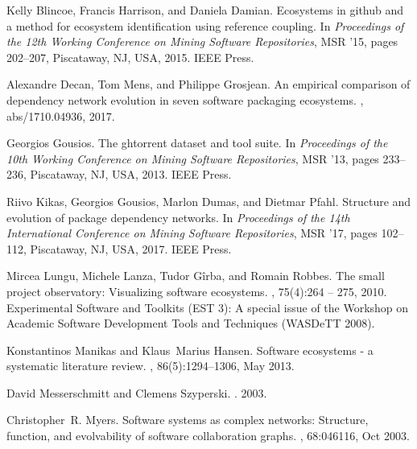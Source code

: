 \documentclass[10pt,conference]{IEEEtran}
\begin{document}
\begin{thebibliography}{00}

  Kelly Blincoe, Francis Harrison, and Daniela Damian.
  \newblock Ecosystems in github and a method for ecosystem identification using
    reference coupling.
  \newblock In {\em Proceedings of the 12th Working Conference on Mining Software
    Repositories}, MSR '15, pages 202--207, Piscataway, NJ, USA, 2015. IEEE
    Press.
  
  Alexandre Decan, Tom Mens, and Philippe Grosjean.
  \newblock An empirical comparison of dependency network evolution in seven
    software packaging ecosystems.
  , abs/1710.04936, 2017.
  
  Georgios Gousios.
  \newblock The ghtorrent dataset and tool suite.
  \newblock In {\em Proceedings of the 10th Working Conference on Mining Software
    Repositories}, MSR '13, pages 233--236, Piscataway, NJ, USA, 2013. IEEE
    Press.
  
  Riivo Kikas, Georgios Gousios, Marlon Dumas, and Dietmar Pfahl.
  \newblock Structure and evolution of package dependency networks.
  \newblock In {\em Proceedings of the 14th International Conference on Mining
    Software Repositories}, MSR '17, pages 102--112, Piscataway, NJ, USA, 2017.
    IEEE Press.
  
  Mircea Lungu, Michele Lanza, Tudor Gîrba, and Romain Robbes.
  \newblock The small project observatory: Visualizing software ecosystems.
  , 75(4):264 -- 275, 2010.
  \newblock Experimental Software and Toolkits (EST 3): A special issue of the
    Workshop on Academic Software Development Tools and Techniques (WASDeTT
    2008).
  
  Konstantinos Manikas and Klaus~Marius Hansen.
  \newblock Software ecosystems - a systematic literature review.
  , 86(5):1294--1306, May 2013.
  
  David Messerschmitt and Clemens Szyperski.
  .
   2003.
  
  Christopher~R. Myers.
  \newblock Software systems as complex networks: Structure, function, and
    evolvability of software collaboration graphs.
  , 68:046116, Oct 2003.
  

\end{thebibliography}
\end{document}
